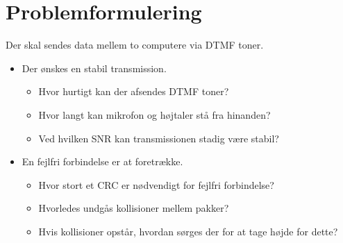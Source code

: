 \newpage
\section{Problemformulering}
Der skal sendes data mellem to computere via DTMF toner.
\begin{itemize}
	\item	Der ønskes en stabil transmission.
	\begin{itemize}
	\item	Hvor hurtigt kan der afsendes DTMF toner?
	\item	Hvor langt kan mikrofon og højtaler stå fra hinanden?
	\item	Ved hvilken SNR kan transmissionen stadig være stabil?
	\end{itemize}
	\item	En fejlfri forbindelse er at foretrække.
	\begin{itemize}
	\item	Hvor stort et CRC er nødvendigt for fejlfri forbindelse?
	\item	Hvorledes undgås kollisioner mellem pakker?
	\item	Hvis kollisioner opstår, hvordan sørges der for at tage højde for dette?
	\end{itemize}
\end{itemize}






